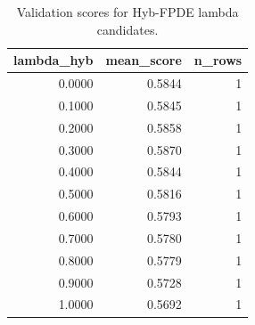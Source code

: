 \begin{table}[t]
\caption{Validation scores for Hyb-FPDE lambda candidates.}
\label{tab:lambda_distribution_computed}
\centering
\begin{tabular}{rrr}
\toprule
lambda\_hyb & mean\_score & n\_rows \\
\midrule
0.0000 & 0.5844 & 1 \\
0.1000 & 0.5845 & 1 \\
0.2000 & 0.5858 & 1 \\
0.3000 & 0.5870 & 1 \\
0.4000 & 0.5844 & 1 \\
0.5000 & 0.5816 & 1 \\
0.6000 & 0.5793 & 1 \\
0.7000 & 0.5780 & 1 \\
0.8000 & 0.5779 & 1 \\
0.9000 & 0.5728 & 1 \\
1.0000 & 0.5692 & 1 \\
\bottomrule
\end{tabular}

\end{table}
